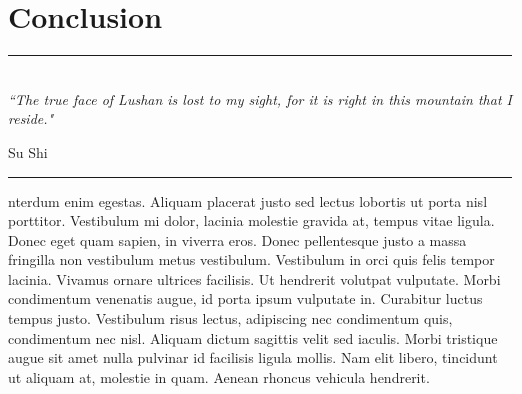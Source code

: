 
\chapter{Conclusion} %

\label{Chapter6} %


\rule{\textwidth}{0.4pt} \\[0.5cm]
\textit{``The true face of Lushan is lost to my sight, for it is right in this mountain that I reside."}

\begin{flushright}
Su Shi
\end{flushright}
\rule{\textwidth}{0.4pt} 



nterdum enim egestas. Aliquam placerat justo sed lectus lobortis ut porta nisl porttitor. Vestibulum mi dolor, lacinia molestie gravida at, tempus vitae ligula. Donec eget quam sapien, in viverra eros. Donec pellentesque justo a massa fringilla non vestibulum metus vestibulum. Vestibulum in orci quis felis tempor lacinia. Vivamus ornare ultrices facilisis. Ut hendrerit volutpat vulputate. Morbi condimentum venenatis augue, id porta ipsum vulputate in. Curabitur luctus tempus justo. Vestibulum risus lectus, adipiscing nec condimentum quis, condimentum nec nisl. Aliquam dictum sagittis velit sed iaculis. Morbi tristique augue sit amet nulla pulvinar id facilisis ligula mollis. Nam elit libero, tincidunt ut aliquam at, molestie in quam. Aenean rhoncus vehicula hendrerit.
